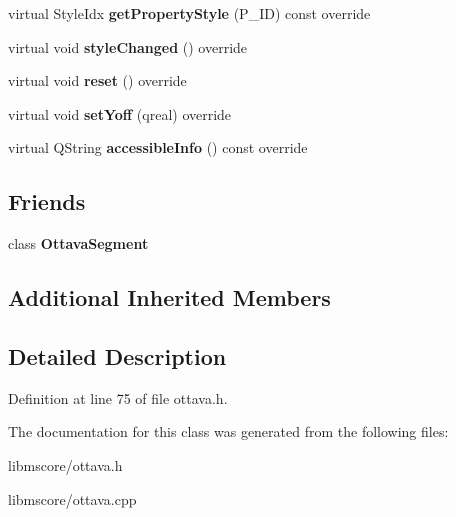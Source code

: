 \begin{DoxyCompactItemize}
virtual Style\+Idx {\bfseries get\+Property\+Style} (P\+\_\+\+ID) const override
\item 
\mbox{\label{class_ms_1_1_ottava_afb280129cc4ab11d939c1607daa8b60b}} 
virtual void {\bfseries style\+Changed} () override
\item 
\mbox{\label{class_ms_1_1_ottava_a014e6a9c9f48a11ea6d34e955688bd54}} 
virtual void {\bfseries reset} () override
\item 
\mbox{\label{class_ms_1_1_ottava_afcfba369399772d26c8a85d03a56c4aa}} 
virtual void {\bfseries set\+Yoff} (qreal) override
\item 
\mbox{\label{class_ms_1_1_ottava_a6eb01a143c74345c80610418a3eab1c2}} 
virtual Q\+String {\bfseries accessible\+Info} () const override
\end{DoxyCompactItemize}
\subsection*{Friends}
\begin{DoxyCompactItemize}
\item 
\mbox{\label{class_ms_1_1_ottava_a0bed203fbbf096f5ce104f52080418c0}} 
class {\bfseries Ottava\+Segment}
\end{DoxyCompactItemize}
\subsection*{Additional Inherited Members}


\subsection{Detailed Description}


Definition at line 75 of file ottava.\+h.



The documentation for this class was generated from the following files\+:\begin{DoxyCompactItemize}
\item 
libmscore/ottava.\+h\item 
libmscore/ottava.\+cpp\end{DoxyCompactItemize}
